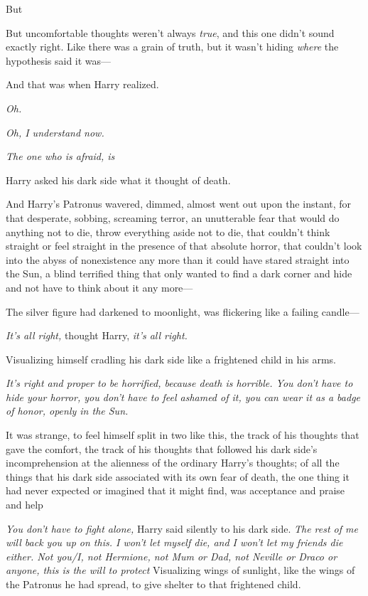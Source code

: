 But{\el}

But uncomfortable thoughts weren't always \emph{true}, and this one didn't
sound exactly right. Like there was a grain of truth, but it wasn't hiding
\emph{where} the hypothesis said it was—

And that was when Harry realized.

\emph{Oh.}

\emph{Oh, I understand now.}

\emph{The one who is afraid, is{\el}}

Harry asked his dark side what it thought of death.

And Harry's Patronus wavered, dimmed, almost went out upon the instant, for
that desperate, sobbing, screaming terror, an unutterable fear that would do
anything not to die, throw everything aside not to die, that couldn't think
straight or feel straight in the presence of that absolute horror, that
couldn't look into the abyss of nonexistence any more than it could have stared
straight into the Sun, a blind terrified thing that only wanted to find a dark
corner and hide and not have to think about it any more—

The silver figure had darkened to moonlight, was flickering like a failing
candle—

\emph{It's all right,} thought Harry, \emph{it's all right.}

Visualizing himself cradling his dark side like a frightened child in his arms.

\emph{It's right and proper to be horrified, because death is horrible. You
don't have to hide your horror, you don't have to feel ashamed of it, you can
wear it as a badge of honor, openly in the Sun.}

It was strange, to feel himself split in two like this, the track of his
thoughts that gave the comfort, the track of his thoughts that followed his
dark side's incomprehension at the alienness of the ordinary Harry's thoughts;
of all the things that his dark side associated with its own fear of death, the
one thing it had never expected or imagined that it might find, was acceptance
and praise and help{\el}

\emph{You don't have to fight alone,} Harry said silently to his dark side.
\emph{The rest of me will back you up on this. I won't let myself die, and I
won't let my friends die either. Not you/I, not Hermione, not Mum or Dad, not
Neville or Draco or anyone, this is the will to protect{\el}} Visualizing
wings of sunlight, like the wings of the Patronus he had spread, to give
shelter to that frightened child.

